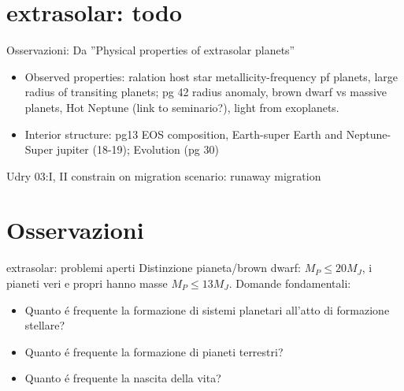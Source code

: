 \section{extrasolar: todo}

\begin{wordonframe}{Osservazioni: Da ''Physical properties of extrasolar planets''}\tolbf
\begin{itemize}
\item Observed properties: ralation host star metallicity-frequency pf planets, large radius of transiting planets; pg 42 radius anomaly, brown dwarf vs massive planets, Hot Neptune (link to seminario?), light from exoplanets.
\item Interior structure: pg13 EOS composition, Earth-super Earth and Neptune-Super jupiter (18-19); Evolution (pg 30)
\end{itemize}
\end{wordonframe}

\begin{wordonframe}{Udry 03:I, II}
constrain on migration scenario: runaway migration
\end{wordonframe}

\section{Osservazioni}

\begin{wordonframe}{extrasolar: problemi aperti}
Distinzione pianeta/brown dwarf: $M_P\leq20M_J$, i pianeti veri e propri hanno masse $M_P\leq13M_J$.
Domande fondamentali:
\begin{itemize}
    \item Quanto \'e frequente la formazione di sistemi planetari all'atto di formazione stellare?
    \item Quanto \'e frequente la formazione di pianeti terrestri?
    \item Quanto \'e frequente la nascita della vita?
\end{itemize}
\end{wordonframe}

